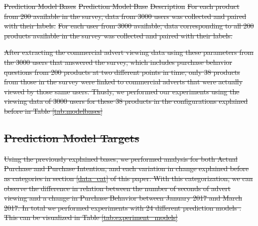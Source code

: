 \documentclass[review]{elsarticle}
\makeatletter
\newcommand*{\@rowstyle}{}
\newcommand*{\rowstyle}[1]{%
  \gdef\@rowstyle{#1}%
  \@rowstyle\ignorespaces%
}
\providecommand{\DIFdeltex}[1]{{\protect\color{red}\sout{#1}}}                      %
\providecommand{\DIFdelbegin}{} %
\providecommand{\DIFdelend}{} %
\providecommand{\DIFdelFL}[1]{\DIFdel{#1}} %
\providecommand{\DIFdel}[1]{\texorpdfstring{\DIFdeltex{#1}}{}} %
\newcommand{\DIFscaledelfig}{0.5}
\newlength{\DIFdelgraphicswidth} %
\newlength{\DIFdelgraphicsheight} %
\newcommand{\DIFdelincludegraphics}[2][]{%
\sbox{\DIFdelgraphicsbox}{\DIFOincludegraphics[#1]{#2}}%
\settoboxwidth{\DIFdelgraphicswidth}{\DIFdelgraphicsbox} %
\settoboxtotalheight{\DIFdelgraphicsheight}{\DIFdelgraphicsbox} %
\scalebox{\DIFscaledelfig}{%
\parbox[b]{\DIFdelgraphicswidth}{\usebox{\DIFdelgraphicsbox}\\[-\baselineskip] \rule{\DIFdelgraphicswidth}{0em}}\llap{\resizebox{\DIFdelgraphicswidth}{\DIFdelgraphicsheight}{%
\setlength{\unitlength}{\DIFdelgraphicswidth}%
\begin{picture}(1,1)%
\thicklines\linethickness{2pt} %
{\color[rgb]{1,0,0}\put(0,0){\framebox(1,1){}}}%
{\color[rgb]{1,0,0}\put(0,0){\line( 1,1){1}}}%
{\color[rgb]{1,0,0}\put(0,1){\line(1,-1){1}}}%
\end{picture}%
}\hspace*{3pt}}} %
} %
\DeclareRobustCommand{\DIFdelbegin}{\DIFOdelbegin \let\includegraphics\DIFdelincludegraphics} %
\DeclareRobustCommand{\DIFdelend}{\DIFOaddend \let\includegraphics\DIFOincludegraphics} %
\makeatother
\begin{document}
\DIFdelbegin %
{%
\DIFdelFL{Prediction Model Bases}}%
\DIFdelFL{Prediction Model Base }%
\DIFdelFL{Description }%
\DIFdelFL{For each product from 200 available in the survey, data from 3000 users was collected and paired with their labels. }%
\DIFdelFL{For each user from 3000 available, data corresponding to all 200 products available in the survey was collected and paired with their labels. }%
\DIFdelend 

\DIFdelbegin \DIFdel{After extracting the commercial advert viewing data using these parameters from the 3000 users that answered the survey, which includes purchase behavior questions from 200 products at two different points in time, only 38 products from those in the survey were linked to commercial adverts that were actually viewed by those same users. Thusly, we performed our experiments using the viewing data of 3000 users for these 38 products in the configurations explained before in Table \ref{tab:modelbases}}\DIFdelend


\DIFdelbegin \subsection{\DIFdel{Prediction Model Targets}}
\addtocounter{subsection}{-1}%

\DIFdelbegin \DIFdel{Using the previously explained bases, we performed analysis for both Actual Purchase and Purchase Intention, and each variation in change explained before as categories in section \ref{data_cat} of this paper. With this categorization, we can observe the difference in relation between the number of seconds of advert viewing and a change in Purchase Behavior between January 2017 and March 2017. In total we performed experiments with 24 different prediction models . This can be visualized in Table \ref{tab:experiment_models}}\DIFdelend
\end{document}
